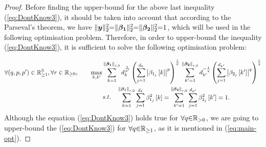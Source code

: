 \begin{proof}
Before finding the upper-bound for the above last inequality (\ref{eq:DontKnow3}), it should be taken into account that according to the Parseval's theorem, we have
$\Vert \boldsymbol{y} \Vert_2^2 {=} \Vert\boldsymbol{\beta_1} \Vert_2^2 {=} \Vert \boldsymbol{\beta_2} \Vert_2^2 {=} 1$, which will be used in the following optimisation problem.
Therefore, in order to upper-bound the inequality (\ref{eq:DontKnow3}), it is sufficient to solve the following optimisation problem:
\iffalse
\begin{equation*}
\begin{aligned}
\max_{k,k'} &\displaystyle\sum_{k=1}^{\mynorm{\mybetao}_{r,0}} d_k^{\frac{1}{p'}} \myparanthese{\displaystyle\sum_{j=1}^{d_k} \beta_{1_j}^p \mybracket{k}}^\frac1p
\displaystyle\sum_{k'=1}^{\mynorm{\mybetaTwo}_{r,0}} d_{k'}^{-\frac{1}{q}} \myparanthese{\displaystyle\sum_{j=1}^{d_{k'}} \beta_{2_j}^q \mybracket{k'}}^\frac1q \\
& s.t. \quad
\begin{aligned}
& \displaystyle\sum_{k=1}^{\mynorm{\mybetao}_{r,0}} \displaystyle\sum_{j=1}^{d_k} \beta_{1_j}^2 \mybracket{k} = 
\displaystyle\sum_{k'=1}^{\mynorm{\mybetaTwo}_{r,0}} \displaystyle\sum_{j=1}^{d_{k'}} \beta_{2_j}^2 \mybracket{k'} = 1 \\
&and \quad \beta_{1_j} \mybracket{k},\beta_{2_j}\mybracket{k'} > 0.
\end{aligned}
\end{aligned}
\end{equation*}
\fi
\begin{equation}
\label{eq:main-opt} 
\begin{aligned}
\forall (q , p , p') \in \mathbb{R}^3_{\geq 1}, \forall r \in \mathbb{R}_{\geq 0}, \qquad
\max_{k,k'} &\displaystyle\sum_{k=1}^{\left\lVert\boldsymbol{\beta_1}\right\rVert_{r,0}} d_k^{\frac{1}{p'}} \left( \displaystyle\sum_{j=1}^{d_k} \left\lvert\beta_{1_j}\left[ k \right]\right\rvert ^p  \right)^\frac1p \,
\displaystyle\sum_{k'=1}^{\left\lVert\boldsymbol{\beta_2}\right\rVert_{r,0}} d_{k'}^{-\frac{1}{q}} \left( \displaystyle\sum_{j=1}^{d_{k'}} \left\lvert\beta_{2_j} \left[ k' \right]\right\rvert ^q  \right)^\frac1q \\
& s.t. \quad
\begin{aligned}
& \displaystyle\sum_{k=1}^{\left\lVert\boldsymbol{\beta_1}\right\rVert_{r,0}} \displaystyle\sum_{j=1}^{d_k} \beta_{1_j}^2 \left[ k \right] = 
\displaystyle\sum_{k'=1}^{\left\lVert\boldsymbol{\beta_2}\right\rVert_{r,0}} \displaystyle\sum_{j=1}^{d_{k'}} \beta_{2_j}^2 \left[ k' \right] = 1.
\end{aligned}
\end{aligned}
\end{equation}
Although the equation (\ref{eq:DontKnow3}) holds true for $\forall q {\in} \mathbb{R}_{{>} 0}$, we are going to upper-bound the (\ref{eq:DontKnow3}) for $\forall q {\in} \mathbb{R}_{{\geq} 1}$, as it is mentioned in (\ref{eq:main-opt}).


\end{proof}
